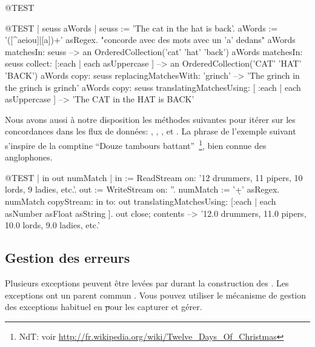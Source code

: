 \documentclass[a4paper,10pt,twoside]{book}
\begin{document}
\begin{code}{@TEST}
\begin{code}{@TEST | seuss aWords |}
seuss := 'The cat in the hat is back'.
aWords := '\<([^aeiou]|[a])+\>' asRegex.    "concorde avec des mots avec un 'a' dedans"
aWords matchesIn: seuss                                                                         --> an OrderedCollection('cat' 'hat' 'back')
aWords matchesIn: seuss collect: [:each | each asUppercase ]                                    --> an OrderedCollection('CAT' 'HAT' 'BACK')
aWords copy: seuss replacingMatchesWith: 'grinch'                                               --> 'The grinch in the grinch is grinch'
aWords copy: seuss translatingMatchesUsing: [ :each | each asUppercase ]                        --> 'The CAT in the HAT is BACK'
\end{code} %

Nous avons aussi à notre disposition les méthodes suivantes pour
itérer sur les concordances dans les flux de données:
,
,
,
 et
.
La phrase de l'exemple suivant s'inspire de la comptine
``Douze tambours battant''~\footnote{NdT: voir \url{http://fr.wikipedia.org/wiki/Twelve_Days_Of_Christmas}}, bien connue des anglophones.

\begin{code}{@TEST | in out numMatch |}
in := ReadStream on: '12 drummers, 11 pipers, 10 lords, 9 ladies, etc.'.
out := WriteStream on: ''.
numMatch := '\<\d+\>' asRegex.
numMatch
  copyStream: in
  to: out
  translatingMatchesUsing: [:each | each asNumber asFloat asString ].
out close; contents --> '12.0 drummers, 11.0 pipers, 10.0 lords, 9.0 ladies, etc.'
\end{code} %


\subsection{Gestion des erreurs}

Plusieurs exceptions peuvent être levées par  durant la
construction des \expregs. Les exceptions ont un parent commun
.
Vous pouvez utiliser le mécanisme de gestion des exceptions habituel
en \st pour les capturer et gérer.


\end{code}
\end{document}
